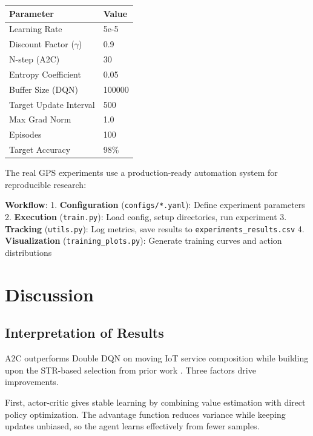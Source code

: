 \documentclass[10pt,twocolumn]{article}
\begin{document}
\begin{tabular}{|l|l|}
	\hline
	\textbf{Parameter}         & \textbf{Value} \\
	\hline
	Learning Rate              & 5e-5           \\
	\hline
	Discount Factor ($\gamma$) & 0.9            \\
	\hline
	N-step (A2C)               & 30             \\
	\hline
	Entropy Coefficient        & 0.05           \\
	\hline
	Buffer Size (DQN)          & 100000         \\
	\hline
	Target Update Interval     & 500            \\
	\hline
	Max Grad Norm              & 1.0            \\
	\hline
	Episodes                   & 100            \\
	\hline
	Target Accuracy            & 98\%           \\
	\hline
\end{tabular}

The real GPS experiments use a production-ready automation system for
reproducible research:

\textbf{Workflow}:
1. \textbf{Configuration} (\texttt{configs/*.yaml}): Define experiment parameters
2. \textbf{Execution} (\texttt{train.py}): Load config, setup directories, run experiment
3. \textbf{Tracking} (\texttt{utils.py}): Log metrics, save results to \texttt{experiments\_results.csv}
4. \textbf{Visualization} (\texttt{training\_plots.py}): Generate training curves and action distributions

\section{Discussion}\label{discussion}

\subsection{Interpretation of Results}\label{interpretation-of-results}

A2C outperforms Double DQN on moving IoT service composition while building upon the STR-based selection from prior work \cite{neiat2021}. Three factors drive improvements.

First, actor-critic gives stable learning by combining value estimation
with direct policy optimization. The advantage function reduces variance
while keeping updates unbiased, so the agent learns effectively from
fewer samples.
\end{document}
